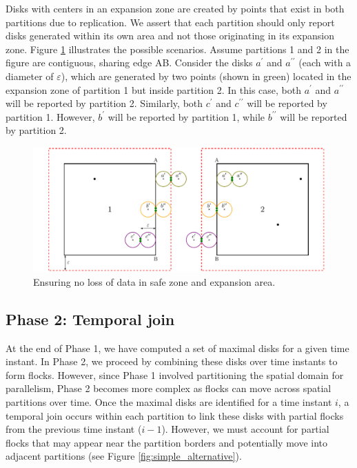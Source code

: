 Disks with centers in an expansion zone are created by points that exist in both partitions due to replication. We assert that each partition should only report 
disks generated within its own area and not those originating in its expansion zone. Figure \ref{fig:ensuring} illustrates the possible scenarios. Assume 
partitions 1 and 2 in the figure are contiguous, sharing edge AB. Consider the disks $a^\prime$ and $a^{\prime\prime}$ (each with a diameter of $\varepsilon$), 
which are generated by two points (shown in green) located in the expansion zone of partition 1 but inside partition 2. In this case, both $a^\prime$ and 
$a^{\prime\prime}$ will be reported by partition 2. Similarly, both $c^\prime$ and $c^{\prime\prime}$ will be reported by partition 1. However, $b^\prime$ will 
be reported by partition 1, while $b^{\prime\prime}$ will be reported by partition 2.

\begin{figure}
    \centering
    \includegraphics[width=\linewidth]{chapterPFlocks/figures/merge.pdf}
    \caption{Ensuring no loss of data in safe zone and expansion area.}\label{fig:ensuring}
\end{figure}

\subsection{Phase 2: Temporal join}\label{sec:temporal_join}
At the end of Phase 1, we have computed a set of maximal disks for a given time instant. In Phase 2, we proceed by combining these disks over time instants to 
form flocks. However, since Phase 1 involved partitioning the spatial domain for parallelism, Phase 2 becomes more complex as flocks can move across spatial 
partitions over time. Once the maximal disks are identified for a time instant $i$, a temporal join occurs within each partition to link these disks with 
partial flocks from the previous time instant ($i-1$). However, we must account for partial flocks that may appear near the partition borders and potentially 
move into adjacent partitions (see Figure \ref{fig:simple_alternative}).

